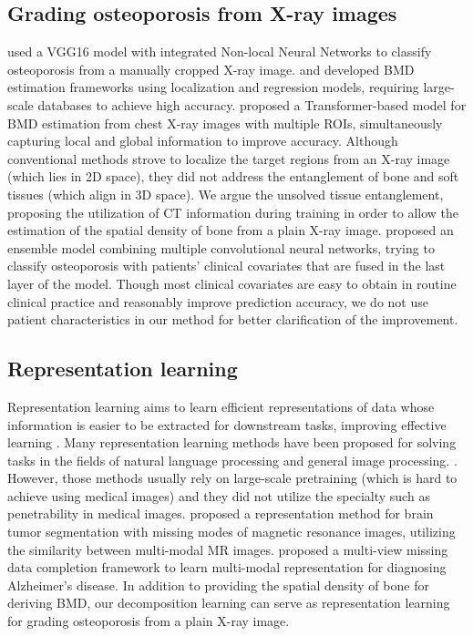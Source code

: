 \documentclass[times,twocolumn,final]{elsarticle}
\begin{document}
\subsection{Grading osteoporosis from X-ray images}
\citet{jang_prediction_2021} used a VGG16 model with integrated Non-local Neural Networks to classify osteoporosis from a manually cropped X-ray image.
\citet{hsieh_automated_2021} and \citet{ho_application_2021} developed BMD estimation frameworks using localization and regression models, requiring large-scale databases to achieve high accuracy.
\citet{wang_lumbar_2023} proposed a Transformer-based model for BMD estimation from chest X-ray images with multiple ROIs, simultaneously capturing local and global information to improve accuracy.
Although conventional methods strove to localize the target regions from an X-ray image (which lies in 2D space), they did not address the entanglement of bone and soft tissues (which align in 3D space).
We argue the unsolved tissue entanglement, proposing the utilization of CT information during training in order to allow the estimation of the spatial density of bone from a plain X-ray image.
\citet{yamamoto_deep_2020} proposed an ensemble model combining multiple convolutional neural networks, trying to classify osteoporosis with patients' clinical covariates that are fused in the last layer of the model.
Though most clinical covariates are easy to obtain in routine clinical practice and reasonably improve prediction accuracy, we do not use patient characteristics in our method for better clarification of the improvement.

\subsection{Representation learning}
Representation learning aims to learn efficient representations of data whose information is easier to be extracted for downstream tasks, improving effective learning \citep{bengio_representation_2013}.
Many representation learning methods have been proposed for solving tasks in the fields of natural language processing and general image processing.
\citep{devlin_bert_2019,noroozi_representation_2017,chen_exploring_2021,donahue_large_2019}. However, those methods usually rely on large-scale pretraining (which is hard to achieve using medical images) and they did not utilize the specialty such as penetrability in medical images.
\citet{zhou_latent_2021} proposed a representation method for brain tumor segmentation with missing modes of magnetic resonance images, utilizing the similarity between multi-modal MR images.
\citet{liu_incomplete_2021} proposed a multi-view missing data completion framework to learn multi-modal representation for diagnosing Alzheimer's disease.
In addition to providing the spatial density of bone for deriving BMD, our decomposition learning can serve as representation learning for grading osteoporosis from a plain X-ray image.
\end{document}
